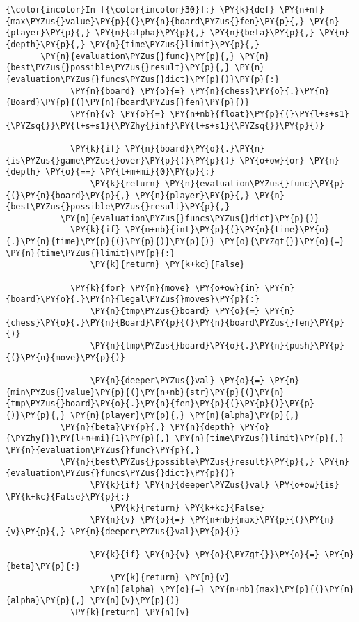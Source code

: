     \begin{Verbatim}[commandchars=\\\{\}]
{\color{incolor}In [{\color{incolor}30}]:} \PY{k}{def} \PY{n+nf}{max\PYZus{}value}\PY{p}{(}\PY{n}{board\PYZus{}fen}\PY{p}{,} \PY{n}{player}\PY{p}{,} \PY{n}{alpha}\PY{p}{,} \PY{n}{beta}\PY{p}{,} \PY{n}{depth}\PY{p}{,} \PY{n}{time\PYZus{}limit}\PY{p}{,} 
	   \PY{n}{evaluation\PYZus{}func}\PY{p}{,} \PY{n}{best\PYZus{}possible\PYZus{}result}\PY{p}{,} \PY{n}{evaluation\PYZus{}funcs\PYZus{}dict}\PY{p}{)}\PY{p}{:}
             \PY{n}{board} \PY{o}{=} \PY{n}{chess}\PY{o}{.}\PY{n}{Board}\PY{p}{(}\PY{n}{board\PYZus{}fen}\PY{p}{)}
             \PY{n}{v} \PY{o}{=} \PY{n+nb}{float}\PY{p}{(}\PY{l+s+s1}{\PYZsq{}}\PY{l+s+s1}{\PYZhy{}inf}\PY{l+s+s1}{\PYZsq{}}\PY{p}{)}
         
             \PY{k}{if} \PY{n}{board}\PY{o}{.}\PY{n}{is\PYZus{}game\PYZus{}over}\PY{p}{(}\PY{p}{)} \PY{o+ow}{or} \PY{n}{depth} \PY{o}{==} \PY{l+m+mi}{0}\PY{p}{:}
                 \PY{k}{return} \PY{n}{evaluation\PYZus{}func}\PY{p}{(}\PY{n}{board}\PY{p}{,} \PY{n}{player}\PY{p}{,} \PY{n}{best\PYZus{}possible\PYZus{}result}\PY{p}{,} 
		   \PY{n}{evaluation\PYZus{}funcs\PYZus{}dict}\PY{p}{)}
             \PY{k}{if} \PY{n+nb}{int}\PY{p}{(}\PY{n}{time}\PY{o}{.}\PY{n}{time}\PY{p}{(}\PY{p}{)}\PY{p}{)} \PY{o}{\PYZgt{}}\PY{o}{=} \PY{n}{time\PYZus{}limit}\PY{p}{:}
                 \PY{k}{return} \PY{k+kc}{False}
         
             \PY{k}{for} \PY{n}{move} \PY{o+ow}{in} \PY{n}{board}\PY{o}{.}\PY{n}{legal\PYZus{}moves}\PY{p}{:}
                 \PY{n}{tmp\PYZus{}board} \PY{o}{=} \PY{n}{chess}\PY{o}{.}\PY{n}{Board}\PY{p}{(}\PY{n}{board\PYZus{}fen}\PY{p}{)}
                 \PY{n}{tmp\PYZus{}board}\PY{o}{.}\PY{n}{push}\PY{p}{(}\PY{n}{move}\PY{p}{)}
         
                 \PY{n}{deeper\PYZus{}val} \PY{o}{=} \PY{n}{min\PYZus{}value}\PY{p}{(}\PY{n+nb}{str}\PY{p}{(}\PY{n}{tmp\PYZus{}board}\PY{o}{.}\PY{n}{fen}\PY{p}{(}\PY{p}{)}\PY{p}{)}\PY{p}{,} \PY{n}{player}\PY{p}{,} \PY{n}{alpha}\PY{p}{,} 
		   \PY{n}{beta}\PY{p}{,} \PY{n}{depth} \PY{o}{\PYZhy{}}\PY{l+m+mi}{1}\PY{p}{,} \PY{n}{time\PYZus{}limit}\PY{p}{,} \PY{n}{evaluation\PYZus{}func}\PY{p}{,} 
		   \PY{n}{best\PYZus{}possible\PYZus{}result}\PY{p}{,} \PY{n}{evaluation\PYZus{}funcs\PYZus{}dict}\PY{p}{)}
                 \PY{k}{if} \PY{n}{deeper\PYZus{}val} \PY{o+ow}{is} \PY{k+kc}{False}\PY{p}{:}
                     \PY{k}{return} \PY{k+kc}{False}
                 \PY{n}{v} \PY{o}{=} \PY{n+nb}{max}\PY{p}{(}\PY{n}{v}\PY{p}{,} \PY{n}{deeper\PYZus{}val}\PY{p}{)}
         
                 \PY{k}{if} \PY{n}{v} \PY{o}{\PYZgt{}}\PY{o}{=} \PY{n}{beta}\PY{p}{:}
                     \PY{k}{return} \PY{n}{v}
                 \PY{n}{alpha} \PY{o}{=} \PY{n+nb}{max}\PY{p}{(}\PY{n}{alpha}\PY{p}{,} \PY{n}{v}\PY{p}{)}
             \PY{k}{return} \PY{n}{v}
\end{Verbatim}

